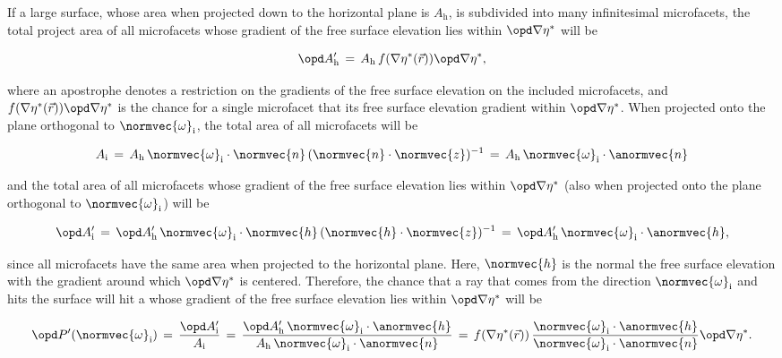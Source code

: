 If a large surface, whose area when projected down to the horizontal plane is $A_{\text{h}}$, is subdivided into many infinitesimal microfacets, the total project area of all microfacets whose gradient of the free surface elevation lies within $\opd\nabla\eta^*$ will be

\begin{equation}
\opd A'_{\text{h}} \,=\, A_{\text{h}}\,f(\nabla\eta^*(\vec{r}))\opd\nabla\eta^*,
\end{equation}

where an apostrophe denotes a restriction on the gradients of the free surface elevation on the included microfacets, and $f(\nabla\eta^*(\vec{r}))\opd \nabla\eta^*$ is the chance for a single microfacet that its free surface elevation gradient within $\opd\nabla\eta^*$. When projected onto the plane orthogonal to $\normvec{\omega}_{\text{i}}$, the total area of all microfacets will be

\begin{equation}
A_{\text{i}} \,=\, A_{\text{h}}\,\normvec{\omega}_{\text{i}}\cdot\normvec{n}\,(\normvec{n}\cdot\normvec{z})^{-1} \,=\, A_{\text{h}}\,\normvec{\omega}_{\text{i}}\cdot\anormvec{n}
\end{equation}

and the total area of all microfacets whose gradient of the free surface elevation lies within $\opd\nabla\eta^*$ (also when projected onto the plane orthogonal to $\normvec{\omega}_{\text{i}}$) will be

\begin{equation}
\opd A'_{\text{i}} \,=\, \opd A'_{\text{h}}\,\normvec{\omega}_{\text{i}}\cdot\normvec{h}\,(\normvec{h}\cdot\normvec{z})^{-1} \,=\, \opd A'_{\text{h}}\,\normvec{\omega}_{\text{i}}\cdot\anormvec{h},
\end{equation}

since all microfacets have the same area when projected to the horizontal plane. Here, $\normvec{h}$ is the normal the free surface elevation with the gradient around which $\opd\nabla\eta^*$ is centered. Therefore, the chance that a ray that comes from the direction $\normvec{\omega}_{\text{i}}$ and hits the surface will hit a \microfacet whose gradient of the free surface elevation lies within $\opd\nabla\eta^*$ will be

\begin{equation} \label{eq:gradient_restricted_reflection_probability}
\opd P'(\normvec{\omega}_{\text{i}}) \,=\, \frac{\opd A'_{\text{i}}}{A_{\text{i}}} \,=\, \frac{\opd A'_{\text{h}}\,\normvec{\omega}_{\text{i}}\cdot\anormvec{h}}{A_{\text{h}}\,\normvec{\omega}_{\text{i}}\cdot\anormvec{n}} \,=\, f(\nabla\eta^*(\vec{r}))\,\frac{\normvec{\omega}_{\text{i}}\cdot\anormvec{h}}{\normvec{\omega}_{\text{i}}\cdot\anormvec{n}}\opd \nabla\eta^*.
\end{equation}

